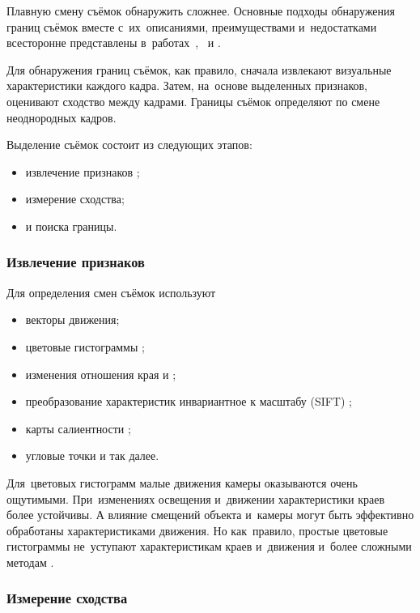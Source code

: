 Плавную смену съёмок обнаружить сложнее.
Основные подходы обнаружения границ съёмок
вместе с~их~описаниями, преимуществами
и~недостатками всесторонне представлены
в~работах~\cite{Smeaton:2010}, \cite{Nigay:1993}~и \cite{Yuan:2007}.

Для обнаружения границ съёмок, как правило,
сначала извлекают визуальные характеристики каждого кадра.
Затем, на~основе выделенных признаков, оценивают сходство между кадрами.
Границы съёмок определяют по смене неоднородных кадров.

Выделение съёмок состоит из следующих этапов:
\begin{itemize}
    \item извлечение признаков \cite{Chantamunee:2007};
    \item измерение сходства;
    \item и поиска границы.
\end{itemize}


\subsubsection{Извлечение признаков}

Для определения смен съёмок используют
\begin{itemize}
    \item векторы движения;
    \item цветовые гистограммы \cite{Hoi:2006};
    \item изменения отношения края \cite{Yoo:2006} \cite{Zhao:2006} и \cite{Porter:2004};
    \item преобразование характеристик инвариантное к масштабу (SIFT) \cite{Chang:2008};
    \item карты салиентности \cite{Wu:2008};
    \item угловые точки \cite{Gao:2006} и так далее.
\end{itemize}

Для~цветовых гистограмм малые движения камеры оказываются очень ощутимыми.
При~изменениях освещения и~движении характеристики краев
более устойчивы. А влияние смещений объекта
и~камеры могут быть эффективно обработаны характеристиками движения.
Но как~правило, простые цветовые гистограммы
не~уступают характеристикам краев и~движения
и~более сложными методам \cite{Yuan:2007}.


\subsubsection{Измерение сходства}

